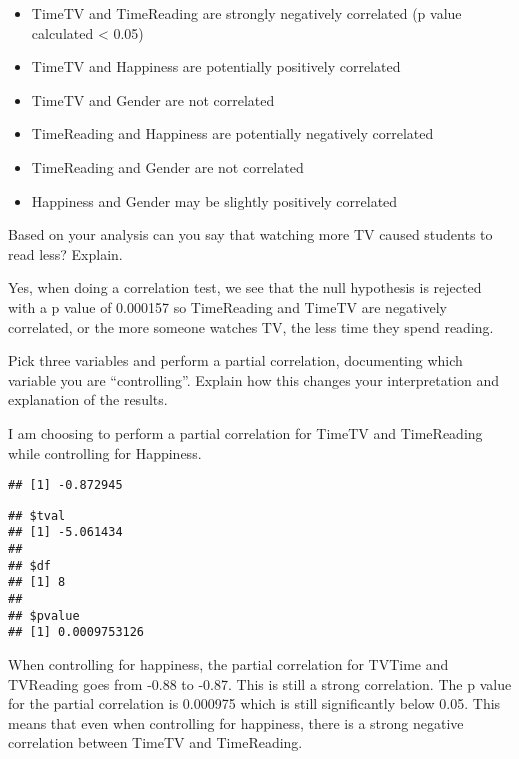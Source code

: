 \documentclass[
]{article}
\providecommand{\tightlist}{%
  \setlength{\itemsep}{0pt}\setlength{\parskip}{0pt}}
\begin{document}
\begin{itemize}
\tightlist
\item
  TimeTV and TimeReading are strongly negatively correlated (p value
  calculated \textless{} 0.05)
\item
  TimeTV and Happiness are potentially positively correlated
\item
  TimeTV and Gender are not correlated
\item
  TimeReading and Happiness are potentially negatively correlated
\item
  TimeReading and Gender are not correlated
\item
  Happiness and Gender may be slightly positively correlated
\end{itemize}

Based on your analysis can you say that watching more TV caused students
to read less? Explain.

Yes, when doing a correlation test, we see that the null hypothesis is
rejected with a p value of 0.000157 so TimeReading and TimeTV are
negatively correlated, or the more someone watches TV, the less time
they spend reading.

Pick three variables and perform a partial correlation, documenting
which variable you are ``controlling''. Explain how this changes your
interpretation and explanation of the results.

I am choosing to perform a partial correlation for TimeTV and
TimeReading while controlling for Happiness.

\begin{verbatim}
## [1] -0.872945
\end{verbatim}

\begin{verbatim}
## $tval
## [1] -5.061434
## 
## $df
## [1] 8
## 
## $pvalue
## [1] 0.0009753126
\end{verbatim}

When controlling for happiness, the partial correlation for TVTime and
TVReading goes from -0.88 to -0.87. This is still a strong correlation.
The p value for the partial correlation is 0.000975 which is still
significantly below 0.05. This means that even when controlling for
happiness, there is a strong negative correlation between TimeTV and
TimeReading.
\end{document}

